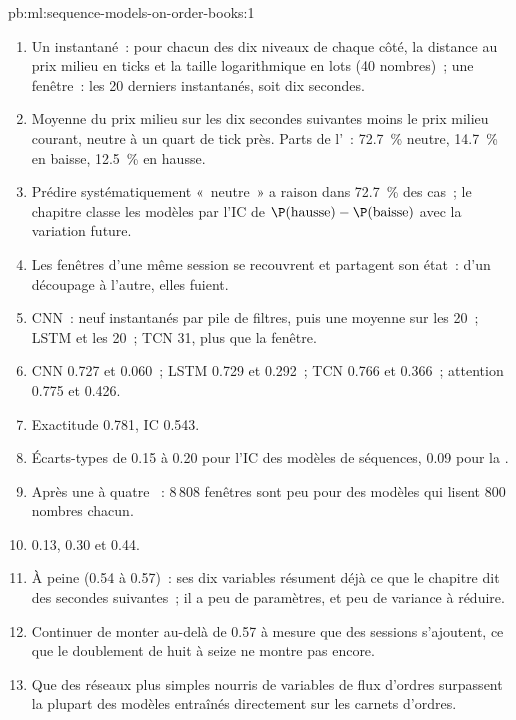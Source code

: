 \begin{solution}{pb:ml:sequence-models-on-order-books:1}
\begin{enumerate}
\item Un instantané~: pour chacun des dix niveaux de chaque côté, la distance au prix milieu en ticks et la taille logarithmique en lots (40 nombres)~;
une fenêtre~: les 20 derniers instantanés, soit dix secondes.
\item Moyenne du prix milieu sur les dix secondes suivantes moins le prix milieu courant, neutre à un quart de tick près. Parts de l'~: 72.7~\% neutre,
14.7~\% en baisse, 12.5~\% en hausse.
\item Prédire systématiquement «~neutre~» a raison dans 72.7~\% des cas~; le chapitre classe les modèles par l'IC de $\P(\text{hausse}) -
\P(\text{baisse})$ avec la variation future.
\item Les fenêtres d'une même session se recouvrent et partagent son état~: d'un découpage à l'autre, elles fuient.
\item CNN~: neuf instantanés par pile de filtres, puis une moyenne sur les 20~; LSTM et  les 20~; TCN 31, plus que la
fenêtre.
\item CNN 0.727 et 0.060~; LSTM 0.729 et 0.292~; TCN 0.766 et 0.366~; attention 0.775 et 0.426.
\item Exactitude 0.781, IC 0.543.
\item Écarts-types de 0.15 à 0.20 pour l'IC des modèles de séquences, 0.09 pour la .
\item Après une à quatre ~: 8\,808 fenêtres sont peu pour des modèles qui lisent 800 nombres chacun.
\item 0.13, 0.30 et 0.44.
\item À peine (0.54 à 0.57)~: ses dix variables résument déjà ce que le chapitre dit des secondes suivantes~; il a peu de
paramètres, et peu de variance à réduire.
\item Continuer de monter au-delà de 0.57 à mesure que des sessions s'ajoutent, ce que le doublement de huit à seize ne montre pas encore.
\item Que des réseaux plus simples nourris de variables de flux d'ordres surpassent la plupart des modèles entraînés directement sur les carnets d'ordres.

\end{enumerate}
\end{solution}
